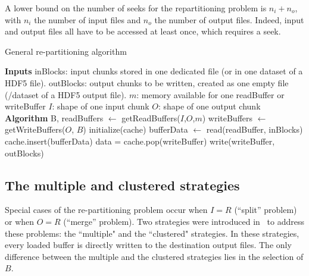 \documentclass[conference]{IEEEtran}
\begin{document}
A lower bound on the number of seeks for the repartitioning problem is
$n_i + n_o$, with $n_i$ the number of input files and $n_o$ the number of output
files. Indeed, input and output files all have to be accessed at least once,
which requires a seek.

\begin{algorithm}
  \caption{General re-partitioning algorithm}
  \label{algo:generalrepartition}
  \begin{algorithmic}[1]
    \STATE \textbf{Inputs}
    \STATE inBlocks: input chunks stored in one dedicated file (or in one dataset of a HDF5 file).
    \STATE outBlocks: output chunks to be written, created as one empty file (/dataset of a HDF5 output file).
    \STATE $m$: memory available for one readBuffer or writeBuffer
    \STATE $I$: shape of one input chunk
    \STATE $O$: shape of one output chunk
    \STATE
    \STATE \textbf{Algorithm}
    \STATE B, readBuffers $\leftarrow$ getReadBuffers($I$,$O$,$m$)
    \STATE writeBuffers $\leftarrow$ getWriteBuffers($O$, $B$)
    \STATE initialize(cache)
      \STATE bufferData $\leftarrow$ read(readBuffer, inBlocks)
      \STATE cache.insert(bufferData)
          \STATE data = cache.pop(writeBuffer)
          \STATE write(writeBuffer, outBlocks)
        \ENDIF
      \ENDFOR
    \ENDFOR

  \end{algorithmic}
\end{algorithm}

\subsection{The multiple and clustered strategies}
Special cases of the re-partitioning problem occur when $I=R$ (``split'' problem)
or when $O=R$ (``merge'' problem). Two strategies were introduced
in~\cite{seqalgorithms} to address these problems: the ``multiple" and the
``clustered" strategies. In these strategies, every loaded buffer is directly written to the
destination output files.
The only difference between the multiple and the clustered strategies lies in
the selection of $B$.
\end{document}
